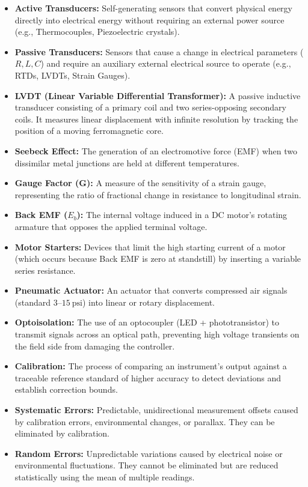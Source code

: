 \begin{itemize}
  \item \textbf{Active Transducers:} Self-generating sensors that convert physical energy directly into electrical energy without requiring an external power source (e.g., Thermocouples, Piezoelectric crystals).
  \item \textbf{Passive Transducers:} Sensors that cause a change in electrical parameters ($R, L, C$) and require an auxiliary external electrical source to operate (e.g., RTDs, LVDTs, Strain Gauges).
  \item \textbf{LVDT (Linear Variable Differential Transformer):} A passive inductive transducer consisting of a primary coil and two series-opposing secondary coils. It measures linear displacement with infinite resolution by tracking the position of a moving ferromagnetic core.
  \item \textbf{Seebeck Effect:} The generation of an electromotive force (EMF) when two dissimilar metal junctions are held at different temperatures.
  \item \textbf{Gauge Factor (G):} A measure of the sensitivity of a strain gauge, representing the ratio of fractional change in resistance to longitudinal strain.
  \item \textbf{Back EMF ($E_b$):} The internal voltage induced in a DC motor's rotating armature that opposes the applied terminal voltage.
  \item \textbf{Motor Starters:} Devices that limit the high starting current of a motor (which occurs because Back EMF is zero at standstill) by inserting a variable series resistance.
  \item \textbf{Pneumatic Actuator:} An actuator that converts compressed air signals (standard $3\text{--}15\ \text{psi}$) into linear or rotary displacement.
  \item \textbf{Optoisolation:} The use of an optocoupler (LED + phototransistor) to transmit signals across an optical path, preventing high voltage transients on the field side from damaging the controller.
  \item \textbf{Calibration:} The process of comparing an instrument's output against a traceable reference standard of higher accuracy to detect deviations and establish correction bounds.
  \item \textbf{Systematic Errors:} Predictable, unidirectional measurement offsets caused by calibration errors, environmental changes, or parallax. They can be eliminated by calibration.
  \item \textbf{Random Errors:} Unpredictable variations caused by electrical noise or environmental fluctuations. They cannot be eliminated but are reduced statistically using the mean of multiple readings.

\end{itemize}

